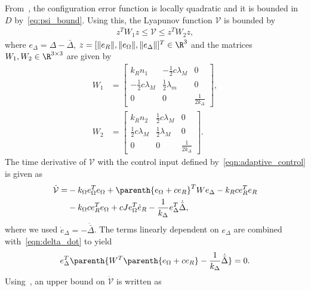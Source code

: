 From~, the configuration error function is locally quadratic and it is bounded in \( D \) by~\cref{eq:psi_bound}.
Using this, the Lyapunov function \( \mathcal{V} \) is bounded by
\begin{align*} %
	z^T W_1 z \leq \mathcal{V} \leq z^T W_2 z ,
\end{align*}
where \( e_\Delta = \Delta - \bar{\Delta} \), \( z = [\|e_R\|,\|e_\Omega\|,\|e_\Delta\|]^T\in\R^3 \) and the matrices \(W_1,W_2 \in \R^{3 \times 3}\) are given by
\begin{align*}
	W_1 & = \begin{bmatrix}
		k_R n_1 & -\frac{1}{2} c \lambda_M & 0 \\
		-\frac{1}{2} c \lambda_M & \frac{1}{2} \lambda_m & 0 \\
		0 & 0 & \frac{1}{2 k_\Delta}
	\end{bmatrix},\\
	W_2 & = \begin{bmatrix}
		k_R n_2 & \frac{1}{2} c \lambda_M & 0 \\
		\frac{1}{2} c \lambda_M & \frac{1}{2} \lambda_M & 0 \\
		0 & 0 & \frac{1}{2 k_\Delta}
	\end{bmatrix} .
\end{align*}
The time derivative of \( \mathcal{V}\) with the control input defined by~\cref{eqn:adaptive_control} is given as
\begin{align*}
	\dot{\mathcal{V}} =& - k_\Omega e_\Omega^T e_\Omega + \parenth{e_\Omega + c e_R}^T W e_\Delta - k_R c e_R^T e_R \nonumber\\
	&- k_\Omega c e_R^T e_\Omega + c J e_\Omega^T \dot{e}_R - \frac{1}{k_\Delta} e_\Delta^T \dot{\bar{\Delta}} , \label{eqn:vdot}
\end{align*}
where we used \( \dot{e}_\Delta = - \dot{\bar{\Delta}} \).
The terms linearly dependent on \( e_\Delta\) are combined with~\cref{eqn:delta_dot} to yield
\begin{align*}
	 e_\Delta^T \parenth{W^T \parenth{e_\Omega + c e_R} - \frac{1}{k_\Delta} \dot{\bar{\Delta}}} = 0 . 
\end{align*}
Using~, an upper bound on \( \dot{\mathcal{V}} \) is written as
